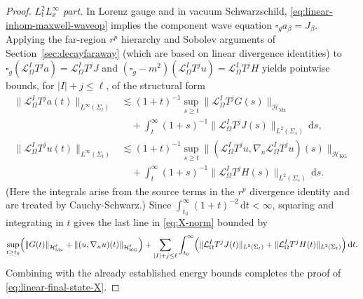 \documentclass[11pt]{article}
\numberwithin{equation}{section}
\theoremstyle{plain}
\theoremstyle{definition}
\theoremstyle{remark}
\newcommand{\dd}{\mathrm{d}}
\begin{document}
\begin{proof}
\medskip\noindent
\textit{$L^{2}_{t}L^{\infty}_{x}$ part.}
In Lorenz gauge and in vacuum Schwarzschild, \eqref{eq:linear-inhom-maxwell-waveop} implies the component wave equation
$\square_g a_\beta = J_\beta$.
Applying the far-region $r^{p}$ hierarchy and Sobolev arguments of Section~\ref{sec:decayfaraway} (which are based on linear divergence identities) to
$\square_g(\mathcal L_{\Omega}^{I}T^{j}a)=\mathcal L_{\Omega}^{I}T^{j}J$
and
$(\square_g-m^{2})(\mathcal L_{\Omega}^{I}T^{j}u)=\mathcal L_{\Omega}^{I}T^{j}H$
yields pointwise bounds, for $|I|+j\le\ell$, of the structural form
\begin{eqnarray}
\|\mathcal L_{\Omega}^{I}T^{j}a(t)\|_{L^{\infty}(\Sigma_t)}
&\lesssim
(1+t)^{-1}\sup_{s\ge t}\|\mathcal L_{\Omega}^{I}T^{j}G(s)\|_{\mathcal H_{\mathrm{Mx}}}
\\
&\quad+
\int_{t}^{\infty}(1+s)^{-1}\|\mathcal L_{\Omega}^{I}T^{j}J(s)\|_{L^{2}(\Sigma_s)}\,\dd s,
\\
\|\mathcal L_{\Omega}^{I}T^{j}u(t)\|_{L^{\infty}(\Sigma_t)}
&\lesssim
(1+t)^{-1}\sup_{s\ge t}\|(\mathcal L_{\Omega}^{I}T^{j}u,\nabla_n\mathcal L_{\Omega}^{I}T^{j}u)(s)\|_{\mathcal H_{\mathrm{KG}}}
\\
&\quad+
\int_{t}^{\infty}(1+s)^{-1}\|\mathcal L_{\Omega}^{I}T^{j}H(s)\|_{L^{2}(\Sigma_s)}\,\dd s.
\end{eqnarray}
(Here the integrals arise from the source terms in the $r^{p}$ divergence identity and are treated by Cauchy-Schwarz.)
Since $\int_{t_0}^{\infty}(1+t)^{-2}\,\dd t<\infty$, squaring and integrating in $t$ gives the last line in \eqref{eq:X-norm} bounded by
\begin{equation}
\sup_{t\ge t_{0}}\Bigl(
\|G(t)\|_{\mathcal H_{\mathrm{Mx}}^{\ell}}
+
\|(u,\nabla_n u)(t)\|_{\mathcal H_{\mathrm{KG}}^{\ell}}
\Bigr)
+
\sum_{|I|+j\le\ell}\int_{t_0}^{\infty}\Bigl(
\|\mathcal L_{\Omega}^{I}T^{j}J(t)\|_{L^{2}(\Sigma_t)}
+
\|\mathcal L_{\Omega}^{I}T^{j}H(t)\|_{L^{2}(\Sigma_t)}
\Bigr)\,\dd t.
\end{equation}
Combining with the already established energy bounds completes the proof of \eqref{eq:linear-final-state-X}.
\end{proof}
\end{document}
